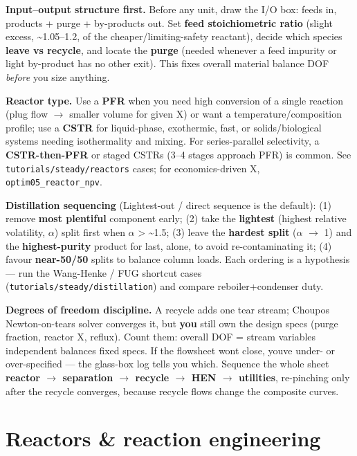 \documentclass[11pt,a4paper]{article}
\begin{document}
\textbf{Input--output structure first.} Before any unit, draw the I/O
box: feeds in, products + purge + by-products out. Set \textbf{feed
stoichiometric ratio} (slight excess, \textasciitilde1.05--1.2, of the
cheaper/limiting-safety reactant), decide which species \textbf{leave vs
recycle}, and locate the \textbf{purge} (needed whenever a feed impurity
or light by-product has no other exit). This fixes overall material
balance DOF \emph{before} you size anything.

\textbf{Reactor type.} Use a \textbf{PFR} when you need high conversion
of a single reaction (plug flow \(\rightarrow\) smaller volume for given X) or want a
temperature/composition profile; use a \textbf{CSTR} for liquid-phase,
exothermic, fast, or solids/biological systems needing isothermality and
mixing. For series-parallel selectivity, a \textbf{CSTR-then-PFR} or
staged CSTRs (3--4 stages approach PFR) is common. See
\texttt{tutorials/steady/reactors} cases; for economics-driven X,
\texttt{optim05\_reactor\_npv}.

\textbf{Distillation sequencing} (Lightest-out / direct sequence is the
default): (1) remove \textbf{most plentiful} component early; (2) take
the \textbf{lightest} (highest relative volatility, \(\alpha\)) split first when
\(\alpha\) \textgreater{} \textasciitilde1.5; (3) leave the \textbf{hardest
split} (\(\alpha\) \(\rightarrow\) 1) and the \textbf{highest-purity} product for last, alone,
to avoid re-contaminating it; (4) favour \textbf{near-50/50} splits to
balance column loads. Each ordering is a hypothesis --- run the
Wang-Henke / FUG shortcut cases (\texttt{tutorials/steady/distillation})
and compare reboiler+condenser duty.

\textbf{Degrees of freedom discipline.} A recycle adds one tear stream;
Choupo\textquotesingle s Newton-on-tears solver converges it, but
\textbf{you} still own the design specs (purge fraction, reactor X,
reflux). Count them: overall DOF = stream variables \textminus{} independent
balances \textminus{} fixed specs. If the flowsheet won\textquotesingle t close,
you\textquotesingle ve under- or over-specified --- the glass-box log
tells you which. Sequence the whole sheet \textbf{reactor \(\rightarrow\) separation \(\rightarrow\)
recycle \(\rightarrow\) HEN \(\rightarrow\) utilities}, re-pinching only after the recycle
converges, because recycle flows change the composite curves.

\hypertarget{reactors--reaction-engineering}{%
\section{Reactors \& reaction
engineering}\label{reactors--reaction-engineering}}
\end{document}
